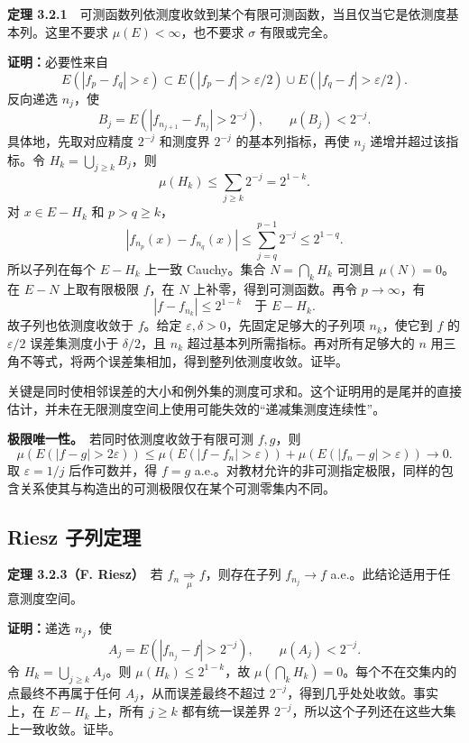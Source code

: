 \documentclass[11pt,a4paper]{article}
\begin{document}
\textbf{定理
3.2.1}　可测函数列依测度收敛到某个有限可测函数，当且仅当它是依测度基本列。这里不要求
\(\mu(E)<\infty\)，也不要求 \(\sigma\) 有限或完全。

\textbf{证明：}必要性来自 \[
E(|f_p-f_q|>\varepsilon)
\subset E(|f_p-f|>\varepsilon/2)\cup E(|f_q-f|>\varepsilon/2).
\] 反向递选 \(n_j\)，使 \[
B_j=E(|f_{n_{j+1}}-f_{n_j}|>2^{-j}),\qquad \mu(B_j)<2^{-j}.
\] 具体地，先取对应精度 \(2^{-j}\) 和测度界 \(2^{-j}\)
的基本列指标，再使 \(n_j\) 递增并超过该指标。令
\(H_k=\bigcup_{j\ge k}B_j\)，则 \[
\mu(H_k)\le\sum_{j\ge k}2^{-j}=2^{1-k}.
\] 对 \(x\in E-H_k\) 和 \(p>q\ge k\)， \[
|f_{n_p}(x)-f_{n_q}(x)|
\le\sum_{j=q}^{p-1}2^{-j}\le2^{1-q}.
\] 所以子列在每个 \(E-H_k\) 上一致 Cauchy。集合 \(N=\bigcap_k H_k\)
可测且 \(\mu(N)=0\)。在 \(E-N\) 上取有限极限 \(f\)，在 \(N\)
上补零，得到可测函数。再令 \(p\to\infty\)，有 \[
|f-f_{n_k}|\le2^{1-k}\quad\text{于 }E-H_k.
\] 故子列也依测度收敛于 \(f\)。给定
\(\varepsilon,\delta>0\)，先固定足够大的子列项 \(n_k\)，使它到 \(f\) 的
\(\varepsilon/2\) 误差集测度小于 \(\delta/2\)，且 \(n_k\)
超过基本列所需指标。再对所有足够大的 \(n\)
用三角不等式，将两个误差集相加，得到整列依测度收敛。证毕。

关键是同时使相邻误差的大小和例外集的测度可求和。这个证明用的是尾并的直接估计，并未在无限测度空间上使用可能失效的``递减集测度连续性''。

\textbf{极限唯一性。}　若同时依测度收敛于有限可测 \(f,g\)，则 \[
\mu(E(|f-g|>2\varepsilon))
\le\mu(E(|f-f_n|>\varepsilon))
 +\mu(E(|f_n-g|>\varepsilon))\longrightarrow0.
\] 取 \(\varepsilon=1/j\) 后作可数并，得 \(f=g\)
a.e.。对教材允许的非可测指定极限，同样的包含关系使其与构造出的可测极限仅在某个可测零集内不同。

\subsection*{Riesz 子列定理}\label{riesz-ux5b50ux5217ux5b9aux7406}

\textbf{定理 3.2.3（F. Riesz）}　若
\(f_n\underset{\mu}{\Rightarrow}f\)，则存在子列 \(f_{n_j}\to f\)
a.e.。此结论适用于任意测度空间。

\textbf{证明：}递选 \(n_j\)，使 \[
A_j=E(|f_{n_j}-f|>2^{-j}),\qquad\mu(A_j)<2^{-j}.
\] 令 \(H_k=\bigcup_{j\ge k}A_j\)。则 \(\mu(H_k)\le2^{1-k}\)，故
\(\mu(\bigcap_k H_k)=0\)。每个不在交集内的点最终不再属于任何
\(A_j\)，从而误差最终不超过 \(2^{-j}\)，得到几乎处处收敛。事实上，在
\(E-H_k\) 上，所有 \(j\ge k\) 都有统一误差界
\(2^{-j}\)，所以这个子列还在这些大集上一致收敛。证毕。
\end{document}
